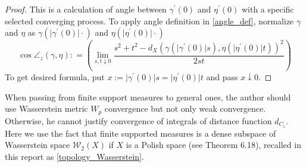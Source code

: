 \begin{proof}
	This is a calculation of angle between $\gamma^\prime(0)$ and $\eta^\prime(0)$ with a specific selected converging process. To apply angle definition in \cref{angle_def}, normalize $\gamma$ and $\eta$ as $\gamma\left(\vert\gamma^\prime(0)\vert \cdot\right)$ and $\eta\left(\vert\eta^\prime(0)\vert \cdot\right)$
	\[
		\cos\angle _ { z } ( \gamma , \eta ): = \left( \lim _ { s , t \downarrow 0 } \frac { s ^ { 2 } + t ^ { 2 } - d _ { X }\left( \gamma (\vert \gamma^\prime(0)\vert s ) , \eta (\vert \eta^\prime(0)\vert  t ) \right) ^ { 2 } } { 2 s t } \right)
	\]
	To get desired formula, put $ x := \vert  \gamma^\prime(0)\vert s =\vert \eta^\prime(0)\vert t $ and pass $x \downarrow 0$.
\end{proof}

\begin{rmk}
	When passing from finite support measures to general ones, the author should use Wasserstein metric $W_p$ convergence but not only weak convergence. Otherwise, he cannot justify convergence of integrals of distance function $d_{C_z}$. Here we use the fact that finite supported measures is a dense subspace of Wasserstein space $\mathcal{W}_2(X)$ if $X$ is a Polish space (see \cite{villani2008optimal} Theorem 6.18), recalled in this report as \cref{topology_Wasserstein}.
\end{rmk}

